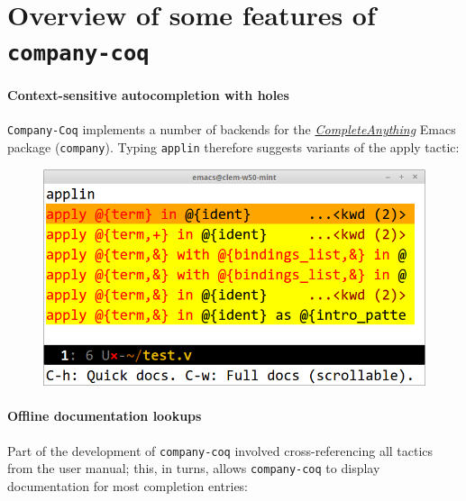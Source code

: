 \documentclass[preprint]{sigplanconf}
\begin{document}
\section*{Overview of some features of \texttt{company-coq}}

\paragraph{Context-sensitive autocompletion with holes} \texttt{Company-Coq} implements a number of backends for the \href{https://company-mode.github.io/}{\emph{CompleteAnything}} Emacs package (\texttt{company}). Typing \texttt{appl{\kern0.1pt}in} therefore suggests variants of the apply tactic:

\begin{figure}[H]
  \centering
  \includegraphics[width=\linewidth]{apply-in-xxl.png}
\end{figure}

\paragraph{Offline documentation lookups} Part of the development of \texttt{company-coq} involved cross-referencing all tactics from the user manual; this, in turns, allows \texttt{company-coq} to display documentation for most completion entries:
\end{document}
